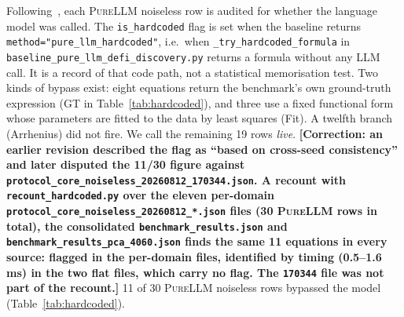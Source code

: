 \documentclass[twoside,11pt]{article}
\newcommand{\PureLLM}{\textsc{PureLLM}}
\begin{document}
Following~\citet{memorization2024audit}, each \PureLLM{} noiseless row is audited for whether the language model
was called. The \texttt{is\_hardcoded} flag is set when the baseline returns
\texttt{method="pure\_llm\_hardcoded"}, i.e.\ when \texttt{\_try\_hardcoded\_formula} in
\texttt{baseline\_pure\_llm\_defi\_discovery.py} returns a formula without any LLM call. It is a record of
that code path, not a statistical memorisation test. Two kinds of bypass exist: eight equations return the
benchmark's own ground-truth expression (GT in Table~\ref{tab:hardcoded}), and three use a fixed functional form whose parameters are fitted to the
data by least squares (Fit). A twelfth branch (Arrhenius) did not fire. We call the remaining 19 rows \emph{live}.
\textbf{[Correction: an earlier revision described the flag as ``based on cross-seed consistency'' and later
disputed the 11/30 figure against \texttt{protocol\_core\_noiseless\_20260812\_170344.json}. A recount
with \texttt{recount\_hardcoded.py} over the eleven per-domain
\texttt{protocol\_core\_noiseless\_20260812\_*.json} files (30 \PureLLM{} rows in total), the consolidated
\texttt{benchmark\_results.json} and \texttt{benchmark\_results\_pca\_4060.json} finds the same 11 equations in every
source: flagged in the per-domain files, identified by timing (0.5--1.6\,ms) in the two flat files, which carry no flag. The
\texttt{170344} file was not part of the recount.]}
11 of 30 \PureLLM{} noiseless rows bypassed the model (Table~\ref{tab:hardcoded}).
\end{document}
